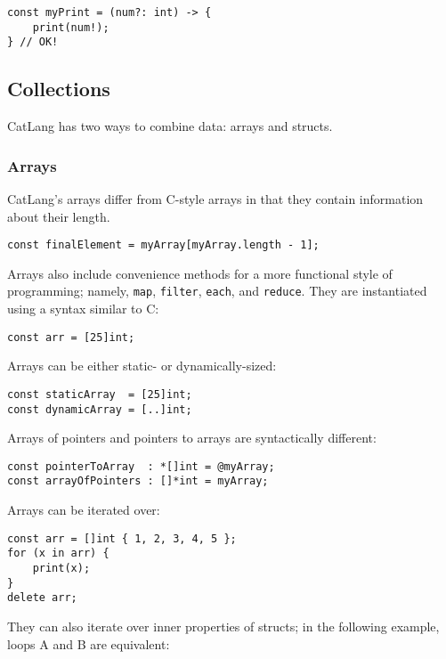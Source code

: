 \documentclass[12pt]{article}
\begin{document}
\begin{lstlisting}
const myPrint = (num?: int) -> {
	print(num!);
} // OK!
\end{lstlisting}

\subsection{Collections}

CatLang has two ways to combine data: arrays and structs.

\subsubsection{Arrays}

CatLang's arrays differ from C-style arrays in that they contain information about their length.

\begin{lstlisting}
const finalElement = myArray[myArray.length - 1];
\end{lstlisting}

Arrays also include convenience methods for a more functional style of programming; namely, \lstinline!map!, \lstinline!filter!, \lstinline!each!, and \lstinline!reduce!. They are instantiated using a syntax similar to C:

\begin{lstlisting}
const arr = [25]int;
\end{lstlisting}

Arrays can be either static- or dynamically-sized:

\begin{lstlisting}
const staticArray  = [25]int;
const dynamicArray = [..]int;
\end{lstlisting}

Arrays of pointers and pointers to arrays are syntactically different:

\begin{lstlisting}
const pointerToArray  : *[]int = @myArray;
const arrayOfPointers : []*int = myArray;
\end{lstlisting}

Arrays can be iterated over:

\begin{lstlisting}
const arr = []int { 1, 2, 3, 4, 5 };
for (x in arr) {
	print(x);
}
delete arr;
\end{lstlisting}

They can also iterate over inner properties of structs; in the following example, loops A and B are equivalent:
\end{document}
